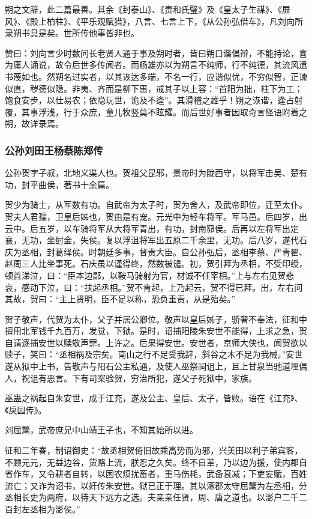 \documentclass[]{article}
\begin{document}
朔之文辞，此二篇最善。其余《封泰山》、《责和氏璧》及《皇太子生禖》、《屏风》、《殿上柏柱》、《平乐观赋猎》，八言、七言上下，《从公孙弘借车》，凡刘向所录朔书具是矣。世所传他事皆非也。

赞曰：刘向言少时数问长老贤人通于事及朔时者，皆曰朔口谐倡辩，不能持论，喜为庸人诵说，故令后世多传闻者。而杨雄亦以为朔言不纯师，行不纯德，其流风遗书蔑如也。然朔名过实者，以其诙达多端，不名一行，应谐似优，不穷似智，正谏似直，秽德似隐。非夷、齐而是柳下惠，戒其子以上容：``首阳为拙，柱下为工；饱食安步，以仕易农；依隐玩世，诡及不逢''。其滑稽之雄乎！朔之诙谐，逢占射覆，其事浮浅，行于众庶，童儿牧竖莫不眩耀。而后世好事者因取奇言怪语附着之朔，故详录焉。

\hypertarget{header-n4956}{%
\subsubsection{公孙刘田王杨蔡陈郑传}\label{header-n4956}}

公孙贺字子叔，北地义渠人也。贺祖父昆邪，景帝时为陇西守，以将军击吴、楚有功，封平曲侯，著书十余篇。

贺少为骑士，从军数有功。自武帝为太子时，贺为舍人，及武帝即位，迁至太仆。贺夫人君孺，卫皇后姊也，贺由是有宠。元光中为轻车将军。军马邑。后四岁，出云中。后五岁，以车骑将军从大将军青出，有功，封南窌侯。后再以左将军出定襄，无功，坐酎金，失侯。复以浮沮将军出五原二千余里，无功。后八岁，遂代石庆为丞相，封葛绎侯。时朝廷多事，督责大臣。自公孙弘后，丞相李蔡、严青翟、赵周三人比坐事死。石庆虽以谨得终，然数被谴。初，贺引拜为丞相，不受印绶，顿首涕泣，曰：``臣本边鄙，以鞍马骑射为官，材诚不任宰相。''上与左右见贺悲哀，感动下泣，曰：``扶起丞相。''贺不肯起，上乃起云，贺不得已拜。出，左右问其故，贺曰：``主上贤明，臣不足以称，恐负重责，从是殆矣。''

贺子敬声，代贺为太仆，父子并居公卿位。敬声以皇后姊子，骄奢不奉法，征和中擅用北军钱千九百万，发觉，下狱。是时，诏捕阳陵朱安世不能得，上求之急，贺自请逐捕安世以赎敬声罪。上许之。后果得安世。安世者，京师大侠也，闻贺欲以赎子，笑曰：``丞相祸及宗矣。南山之行不足受我辞，斜谷之木不足为我械。''安世遂从狱中上书，告敬声与阳石公主私通，及使人巫祭祠诅上，且上甘泉当驰道埋偶人，祝诅有恶言。下有司案验贺，穷治所犯，遂父子死狱中，家族。

巫蛊之祸起自朱安世，成于江充，遂及公主、皇后、太子，皆败。语在《江充》、《戾园传》。

刘屈氂，武帝庶兄中山靖王子也，不知其始所以进。

征和二年春，制诏御史：``故丞相贺倚旧故乘高势而为邪，兴美田以利子弟宾客，不顾元元，无益边谷，货赂上流，朕忍之久矣。终不自革，乃以边为援，使内郡自省作车，又令耕者自转，以困农烦扰畜者，重马伤枆，武备衰减；下吏妄赋，百姓流亡；又诈为诏书，以奸传朱安世。狱已正于理。其以涿郡太守屈氂为左丞相，分丞相长史为两府，以待天下远方之选。夫亲亲任贤，周、唐之道也。以澎户二千二百封左丞相为澎侯。''
\end{document}
